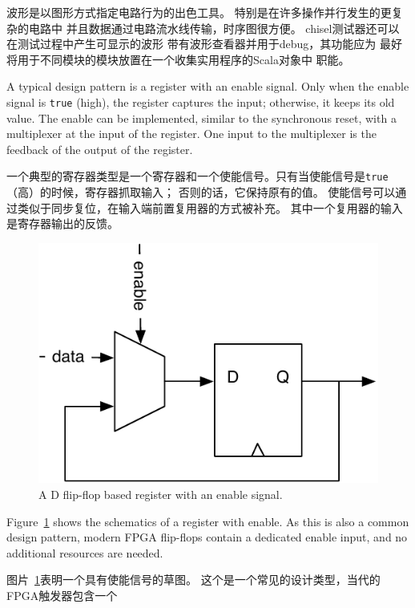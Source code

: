 \documentclass[%
    10pt,
    headinclude, footexclude,
    openright, %
    notitlepage,
    cleardoubleempty,
    headsepline,
    pointlessnumbers,
    bibtotoc, idxtotoc,
    ]{scrbook}
\newcommand{\code}[1]{{\small{\texttt{#1}}}}
\newcommand{\scale}{0.7}
\begin{document}
波形是以图形方式指定电路行为的出色工具。
特别是在许多操作并行发生的更复杂的电路中
并且数据通过电路流水线传输，时序图很方便。
chisel测试器还可以在测试过程中产生可显示的波形
带有波形查看器并用于debug，其功能应为
最好将用于不同模块的模块放置在一个收集实用程序的Scala对象中
职能。

A typical design pattern is a register with an enable signal. Only when the enable signal
is \code{true} (high), the register captures the input; otherwise, it keeps its old value.
The enable can be implemented, similar to the synchronous reset, with
a multiplexer at the input of the register. One input to the multiplexer is the feedback of the
output of the register.

一个典型的寄存器类型是一个寄存器和一个使能信号。只有当使能信号是\code{true}（高）的时候，寄存器抓取输入；
否则的话，它保持原有的值。
使能信号可以通过类似于同步复位，在输入端前置复用器的方式被补充。
其中一个复用器的输入是寄存器输出的反馈。

\begin{figure}
  \centering
  \includegraphics[scale=\scale]{figures/register-enable}
  \caption{A D flip-flop based register with an enable signal.}
  \label{fig:register-enable}
\end{figure}

Figure~\ref{fig:register-enable} shows the schematics of a register with enable.
As this is also a common design pattern, modern FPGA flip-flops contain a
dedicated enable input, and no additional resources are needed.

图片~\ref{fig:register-enable}表明一个具有使能信号的草图。
这个是一个常见的设计类型，当代的FPGA触发器包含一个
\end{document}
